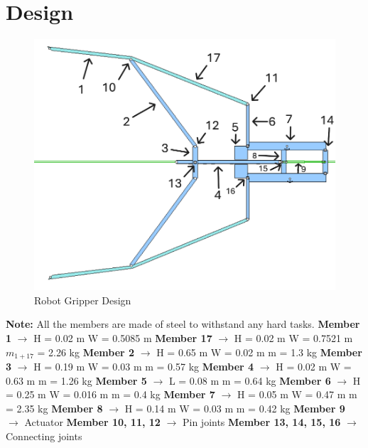 \documentclass{article}
\begin{document}
\newpage
\section*{Design}

\begin{figure}[H]
    \centering
    \includegraphics[width=0.6\linewidth]{Images/Design.PNG}
    \caption{Robot Gripper Design}
\end{figure}
\textbf{Note:} All the members are made of steel to withstand any hard tasks.
\newline\newline
\textbf{Member 1} $\rightarrow$ H = 0.02 m \qquad W = 0.5085 m
\newline\newline
\textbf{Member 17} $\rightarrow$ H = 0.02 m \qquad W = 0.7521 m \qquad $m_{1+17}$ = 2.26 kg
\newline\newline
\textbf{Member 2} $\rightarrow$ H = 0.65 m \qquad W = 0.02 m \qquad m = 1.3 kg
\newline\newline
\textbf{Member 3} $\rightarrow$ H = 0.19 m \qquad W = 0.03 m \qquad m = 0.57 kg
\newline\newline
\textbf{Member 4} $\rightarrow$ H = 0.02 m \qquad W = 0.63 m \qquad m = 1.26 kg
\newline\newline
\textbf{Member 5} $\rightarrow$ L = 0.08 m \qquad m = 0.64 kg
\newline\newline
\textbf{Member 6} $\rightarrow$ H = 0.25 m \qquad W = 0.016 m \qquad m = 0.4 kg
\newline\newline
\textbf{Member 7} $\rightarrow$ H = 0.05 m \qquad W = 0.47 m \qquad m = 2.35 kg
\newline\newline
\textbf{Member 8} $\rightarrow$ H = 0.14 m \qquad W = 0.03 m \qquad m = 0.42 kg
\newline\newline
\textbf{Member 9} $\rightarrow$ Actuator
\newline\newline
\textbf{Member 10, 11, 12}  $\rightarrow$ Pin joints
\newline\newline
\textbf{Member 13, 14, 15, 16}  $\rightarrow$ Connecting joints
\end{document}
